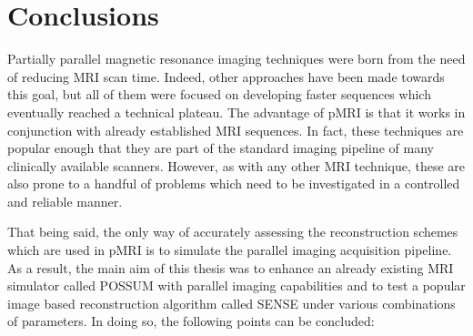 \section{Conclusions}
Partially parallel magnetic resonance imaging techniques were born from the need of reducing MRI scan time. Indeed, other approaches have been made towards this goal, but all of them were focused on developing faster sequences which eventually reached a technical plateau. The advantage of pMRI is that it works in conjunction with already established MRI sequences. In fact, these techniques are popular enough that they are part of the standard imaging pipeline of many clinically available scanners. However, as with any other MRI technique, these are also prone to a handful of problems which need to be investigated in a controlled and reliable manner.

That being said, the only way of accurately assessing the reconstruction schemes which are used in pMRI is to simulate the parallel imaging acquisition pipeline. As a result, the main aim of this thesis was to enhance an already existing MRI simulator called POSSUM with parallel imaging capabilities and to test a popular image based reconstruction algorithm called SENSE under various combinations of parameters. In doing so, the following points can be concluded:


